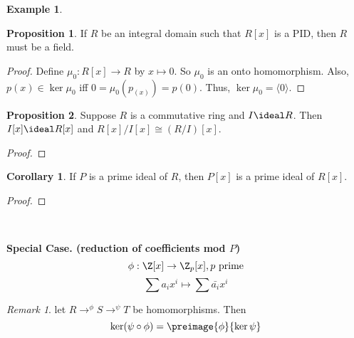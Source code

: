 \documentclass[a5paper]{article}
\theoremstyle{definition}%
\newtheorem*{corollary*}{Corollary}
\newtheorem*{proposition*}{Proposition}
\newtheorem*{example*}{Example}
\numberwithin{exercise}{section}
\theoremstyle{remark}%
\newtheorem*{remark*}{Remark}
\begin{document}
\begin{example*}
\end{example*}

\begin{highlight}
\begin{proposition*}
If $R$ be an integral domain such that $R[x]$ is a PID, then $R$ must be a field. 
\end{proposition*}
\end{highlight}
\begin{proof}
Define $\mu_0:R[x]\to R$ by $x\mapsto 0$. So $\mu_0$ is an onto homomorphism. Also, $p(x)\in \ker \mu_0$ iff $0=\mu_0(p_(x))=p(0)$. Thus, $\ker\mu_0=\langle0\rangle$. 
\end{proof}

\begin{highlight}
\begin{proposition*}
Suppose $R$ is a commutative ring and $I\ideal R$. Then $I[x]\ideal R[x]$ and $R[x]/I[x]\cong(R/I)[x]$. 
\end{proposition*}
\end{highlight}
\begin{proof}\mbox{}
\end{proof}

\begin{highlight}
\begin{corollary*}
If $P$ is a prime ideal of $R$, then $P[x]$ is a prime ideal of $R[x]$.
\end{corollary*}
\end{highlight}
\begin{proof}\mbox{}
\end{proof}

\pagebreak\
\begin{highlight}
\textbf{Special Case. (reduction of coefficients mod $P$)}
$$\phi:\Z[x]\to \Z_p[x], p \text{ prime}$$
$$\sum a_ix^i \mapsto \sum\bar{a_i}x^i$$
\end{highlight}

\begin{highlight}
\begin{remark*}
let $R\to^\phi S\to^\psi T$ be homomorphisms. Then 
$$\ker(\psi\circ\phi)=\preimage{\phi}{\ker\psi}$$
\end{remark*}
\end{highlight}
\end{document}
